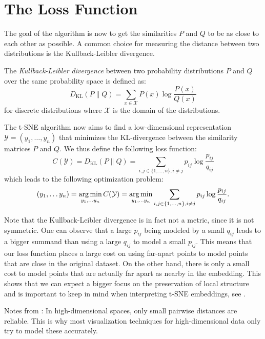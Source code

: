 \section{The Loss Function}
The goal of the algorithm is now to get the similarities $P$ and $Q$ to be as close to each other as possible. 
A common choice for measuring the distance between two distributions is the Kullback-Leibler divergence. 

\begin{defi}
    The \emph{Kullback-Leibler divergence} between two probability distributions $P$ and $Q$ over the same probability space is defined as:
    \[
    D_{\text{KL}}(P \parallel Q) = \sum_{x \in \mathcal{X}} P(x) \log\frac{P(x)}{Q(x)}
    \]
    for discrete distributions where \(\mathcal{X}\) is the domain of the distributions.
\end{defi}

The t-SNE algorithm now aims to find a low-dimensional representation $\mathcal{Y} = (y_1, \dots, y_n)$ that minimizes the KL-divergence between the similarity matrices $P$ and $Q$. 
We thus define the following loss function: 
\begin{equation}
    C(\mathcal{Y}) = D_{\text{KL}}(P \parallel Q) = \sum_{i,j \in \{1,\dots,n\}, i \neq j} p_{ij} \log \frac{p_{ij}}{q_{ij}}
\end{equation}
which leads to the following optimization problem: 
\begin{equation}
    (y_1, \dots y_n) = \operatorname*{arg\,min}_{y_1, \dots y_n} C(\mathcal{Y}) = \operatorname*{arg\,min}_{y_1, \dots y_n} \sum_{i,j \in \{1,\dots,n\}, i \neq j} p_{ij} \log \frac{p_{ij}}{q_{ij}}.
\end{equation}


Note that the Kullback-Leibler divergence is in fact not a metric, since it is not symmetric. 
One can observe that a large $p_{ij}$ being modeled by a small $q_{ij}$ leads to a bigger summand than using a large $q_{ij}$ to model a small $p_{ij}$. 
This means that our loss function places a large cost on using far-apart points to model points that are close in the original dataset. 
On the other hand, there is only a small cost to model points that are actually far apart as nearby in the embedding. 
This shows that we can expect a bigger focus on the preservation of local structure and is important to keep in mind when interpreting t-SNE embeddings, see \cite{Wa16Distill}. 

Notes from \cite{vdMaa14}: In high-dimensional spaces, only small pairwise distances are reliable. This is why most visualization techniques for high-dimensional data only try to model these accurately.

